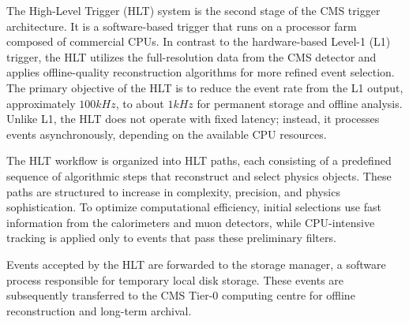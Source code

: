 The High-Level Trigger (HLT) system is the second stage of the CMS trigger architecture. It is a software-based trigger that runs on a processor farm composed of commercial CPUs. In contrast to the hardware-based Level-1 (L1) trigger, the HLT utilizes the full-resolution data from the CMS detector and applies offline-quality reconstruction algorithms for more refined event selection. The primary objective of the HLT is to reduce the event rate from the L1 output, approximately $100\unit{kHz}$, to about $1\unit{kHz}$ for permanent storage and offline analysis. Unlike L1, the HLT does not operate with fixed latency; instead, it processes events asynchronously, depending on the available CPU resources.

The HLT workflow is organized into HLT paths, each consisting of a predefined sequence of algorithmic steps that reconstruct and select physics objects. These paths are structured to increase in complexity, precision, and physics sophistication. To optimize computational efficiency, initial selections use fast information from the calorimeters and muon detectors, while CPU-intensive tracking is applied only to events that pass these preliminary filters. 

Events accepted by the HLT are forwarded to the storage manager, a software process responsible for temporary local disk storage. These events are subsequently transferred to the CMS Tier-0 computing centre for offline reconstruction and long-term archival.



